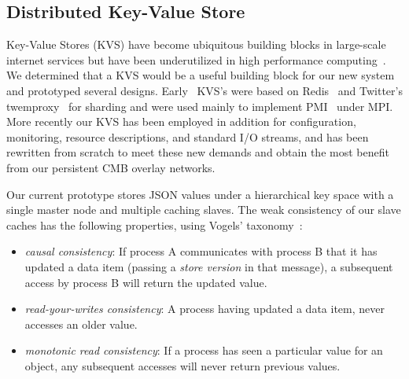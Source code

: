 \subsection{Distributed Key-Value Store}

Key-Value Stores (KVS) have become ubiquitous building blocks in large-scale
internet services but have been underutilized in high performance
computing~\cite{Wang:2013:USE:2503210.2503239}.
We determined that a KVS would be a
useful building block for our new system and prototyped several designs.
Early \flux\ KVS's were based on Redis~\cite{Redis} and Twitter's
twemproxy~\cite{Twemproxy} for sharding and were used mainly to implement
PMI~\cite{PMI2} under MPI.  More recently our KVS has been employed 
in addition for configuration, monitoring, resource descriptions, and
standard I/O streams, and has been rewritten from scratch to meet these
new demands and obtain the most benefit from our persistent CMB overlay
networks.

Our current prototype stores JSON values under a hierarchical key space
with a single master node and multiple caching slaves.  The weak consistency
of our slave caches has the following properties, using Vogels'
taxonomy~\cite{Vogels:2009:EC:1435417.1435432}:
\begin{itemize}
\item{{\em causal consistency}:  If process A communicates with process B
that it has updated a data item (passing a {\em store version} in that
message), a subsequent access by process B will return the updated value.}
\item{{\em read-your-writes consistency}:  A process having updated a
data item, never accesses an older value.}
\item{{\em monotonic read consistency}:  If a process has seen a particular
value for an object, any subsequent accesses will never return previous values.}
\end{itemize}

